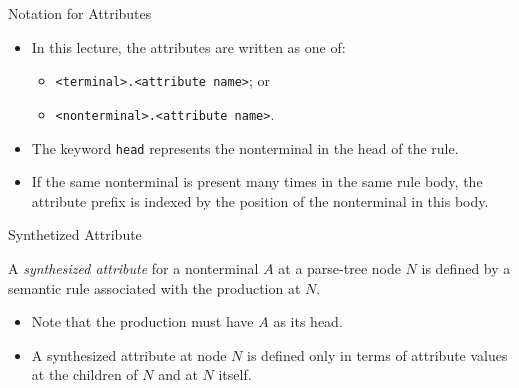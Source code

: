 \begin{bibunit}[apalike]
\begin{frame}{Notation for Attributes}
	\begin{itemize}
	\item In this lecture, the attributes are written as one of:
		\begin{itemize}
		\item \texttt{{\textless}terminal{\textgreater}.{\textless}attribute name{\textgreater}}; or
		\item \texttt{{\textless}nonterminal{\textgreater}.{\textless}attribute name{\textgreater}}.
		\end{itemize}
	\item The keyword \texttt{head} represents the nonterminal in the head of the rule.
	\item If the same nonterminal is present many times in the same rule body, the attribute prefix is indexed by the position of the nonterminal in this body.
	\end{itemize}
	\vfill
	\begin{sdd}
	\pdots
	\end{sdd}
\end{frame}

\begin{frame}{Synthetized Attribute}
	\begin{definition}
		A \emph{synthesized attribute} for a nonterminal $A$ at a parse-tree node $N$ is defined by a semantic rule associated with the production at $N$.
	\end{definition}
	\vfill
	\begin{itemize}
	\item Note that the production must have $A$ as its head.
	\vfill
	\item A synthesized attribute at node $N$ is defined only in terms of attribute values at the children of $N$ and at $N$ itself.
	\end{itemize}
\end{frame}


\end{bibunit}
